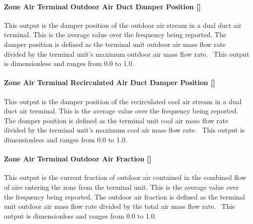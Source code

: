 \paragraph{Zone Air Terminal Outdoor Air Duct Damper Position {[]}}\label{zone-air-terminal-outdoor-air-duct-damper-position}

This output is the damper position of the outdoor air stream in a dual duct air terminal. This is the average value over the frequency being reported. The damper position is defined as the terminal unit outdoor air mass flow rate divided by the terminal unit's maximum outdoor air mass flow rate.~ This output is dimensionless and ranges from 0.0 to 1.0.

\paragraph{Zone Air Terminal Recirculated Air Duct Damper Position {[]}}\label{zone-air-terminal-recirculated-air-duct-damper-position}

This output is the damper position of the recirculated cool air stream in a dual duct air terminal. This is the average value over the frequency being reported. The damper position is defined as the terminal unit cool air mass flow rate divided by the terminal unit's maximum cool air mass flow rate.~ This output is dimensionless and ranges from 0.0 to 1.0.

\paragraph{Zone Air Terminal Outdoor Air Fraction {[]}}\label{zone-air-terminal-outdoor-air-fraction}

This output is the current fraction of outdoor air contained in the combined flow of aire entering the zone from the terminal unit. This is the average value over the frequency being reported. The outdoor air fraction is defined as the terminal unit outdoor air mass flow rate divided by the total air mass flow rate.~ This output is dimensionless and ranges from 0.0 to 1.0.
